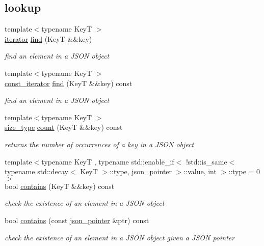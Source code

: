 \subsection*{lookup}
\begin{DoxyCompactItemize}
\item 
{\footnotesize template$<$typename KeyT $>$ }\\\hyperlink{classnlohmann_1_1basic__json_aa549b2b382916b3baafb526e5cb410bd}{iterator} \hyperlink{classnlohmann_1_1basic__json_acdf9b3aab82dcf443dd91ca5ec06b80c}{find} (KeyT \&\&key)
\begin{DoxyCompactList}\small\item\em find an element in a J\+S\+ON object \end{DoxyCompactList}\item 
{\footnotesize template$<$typename KeyT $>$ }\\\hyperlink{classnlohmann_1_1basic__json_aebd2cfa7e4ded4e97cde9269bfeeea38}{const\+\_\+iterator} \hyperlink{classnlohmann_1_1basic__json_a17a516671c29a69bb2e11ca12030316b}{find} (KeyT \&\&key) const
\begin{DoxyCompactList}\small\item\em find an element in a J\+S\+ON object \end{DoxyCompactList}\item 
{\footnotesize template$<$typename KeyT $>$ }\\\hyperlink{classnlohmann_1_1basic__json_a3ada29bca70b4965f6fd37ec1c8f85f7}{size\+\_\+type} \hyperlink{classnlohmann_1_1basic__json_aba5ec6d1e37eda6b11eba491a1e5237e}{count} (KeyT \&\&key) const
\begin{DoxyCompactList}\small\item\em returns the number of occurrences of a key in a J\+S\+ON object \end{DoxyCompactList}\item 
{\footnotesize template$<$typename KeyT , typename std\+::enable\+\_\+if$<$ !std\+::is\+\_\+same$<$ typename std\+::decay$<$ Key\+T $>$\+::type, json\+\_\+pointer $>$\+::value, int $>$\+::type  = 0$>$ }\\bool \hyperlink{classnlohmann_1_1basic__json_a02c9bc4d0f33b7dec20b2798301d6971}{contains} (KeyT \&\&key) const
\begin{DoxyCompactList}\small\item\em check the existence of an element in a J\+S\+ON object \end{DoxyCompactList}\item 
bool \hyperlink{classnlohmann_1_1basic__json_adb82c1f34c73486e013da71ae369e597}{contains} (const \hyperlink{classnlohmann_1_1basic__json_aa8f1f93b32da01b42413643be32b2c27}{json\+\_\+pointer} \&ptr) const
\begin{DoxyCompactList}\small\item\em check the existence of an element in a J\+S\+ON object given a J\+S\+ON pointer \end{DoxyCompactList}\end{DoxyCompactItemize}
